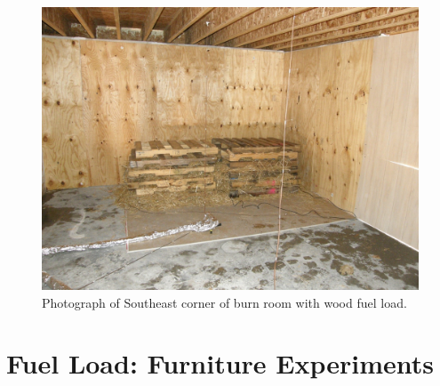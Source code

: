 \documentclass[12pt,oneside]{book}
\begin{document}
			\begin{figure}[!ht]
				\includegraphics[width=6in]{../Figures/Pictures/Wood_Fuel_Package}
				\caption{Photograph of Southeast corner of burn room with wood fuel load.}
				\label{fig:Wood_Fuel_Load}
			\end{figure}
	
	\section{Fuel Load: Furniture Experiments}
	\label{sec:Fuel_Load:_Furniture_Experiments}
	
\end{document}
